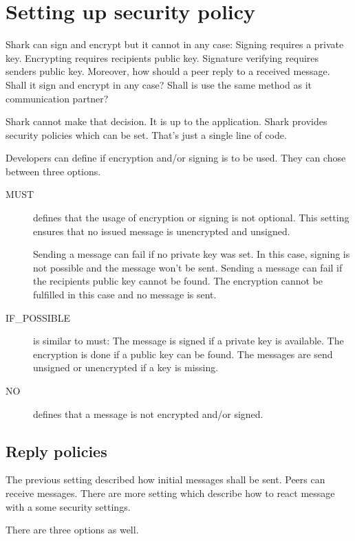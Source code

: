\section{Setting up security policy}
Shark can sign and encrypt but it cannot in any case: Signing requires a private key. Encrypting requires recipients public key. Signature verifying requires senders public key. Moreover, how should a peer reply to a received message. Shall it sign and encrypt in any case? Shall is use the same method as it communication partner? 

Shark cannot make that decision. It is up to the application. Shark provides security policies which can be set. That's just a single line of code.

Developers can define if encryption and/or signing is to be used. They can chose between three options.
\begin{description}
    \item[MUST] defines that the usage of encryption or signing is not optional. This setting ensures that no issued message is unencrypted and unsigned.

Sending a message can fail if no private key was set. In this case, signing is not possible and the message won't be sent. Sending a message can fail if the recipients public key cannot be found. The encryption cannot be fulfilled in this case and no message is sent.

    \item[IF\_POSSIBLE] is similar to must: The message is signed if a private key is available. The encryption is done if a public key can be found. The messages are send unsigned or unencrypted if a key is missing.

    \item[NO] defines that a message is not encrypted and/or signed.
\end{description}

\subsection{Reply policies}
The previous setting described how initial messages shall be sent. Peers can receive messages. There are more setting which describe how to react message with a some security settings.

There are three options as well.

